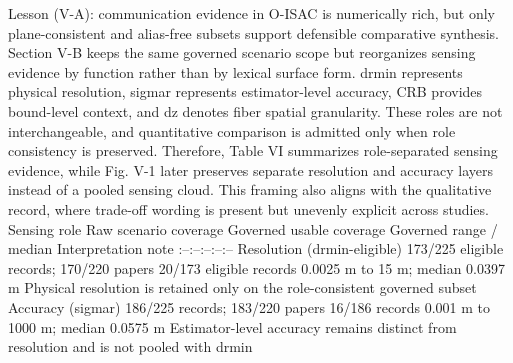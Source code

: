{}Lesson (V-A): communication evidence in O-ISAC is numerically rich, but only plane-consistent and alias-free subsets support defensible comparative synthesis.\markdownRendererInterblockSeparator
{}
\markdownRendererSectionEnd 
\markdownRendererSectionEnd \markdownRendererSectionBegin
{}\markdownRendererInterblockSeparator
{}Section V-B keeps the same governed scenario scope but reorganizes sensing evidence by function rather than by lexical surface form. drmin represents physical resolution, sigma\markdownRendererUnderscore{}r represents estimator-level accuracy, CRB provides bound-level context, and dz denotes fiber spatial granularity. These roles are not interchangeable, and quantitative comparison is admitted only when role consistency is preserved. Therefore, Table VI summarizes role-separated sensing evidence, while Fig. V-1 later preserves separate resolution and accuracy layers instead of a pooled sensing cloud. This framing also aligns with the qualitative record, where trade-off wording is present but unevenly explicit across studies.\markdownRendererInterblockSeparator
{}\markdownRendererSectionBegin
{}\markdownRendererInterblockSeparator
{}\markdownRendererPipe{} Sensing role \markdownRendererPipe{} Raw scenario coverage \markdownRendererPipe{} Governed usable coverage \markdownRendererPipe{} Governed range / median \markdownRendererPipe{} Interpretation note \markdownRendererPipe{}\markdownRendererSoftLineBreak
{}\markdownRendererPipe{}:--\markdownRendererPipe{}:--\markdownRendererPipe{}:--\markdownRendererPipe{}:--\markdownRendererPipe{}:--\markdownRendererPipe{}\markdownRendererSoftLineBreak
{}\markdownRendererPipe{} Resolution (\markdownRendererDollarSign{}dr\markdownRendererUnderscore{}\markdownRendererLeftBrace{}min\markdownRendererRightBrace{}\markdownRendererDollarSign{}-eligible) \markdownRendererPipe{} 173/225 eligible records; 170/220 papers \markdownRendererPipe{} 20/173 eligible records \markdownRendererPipe{} 0.0025 m to 15 m; median 0.0397 m \markdownRendererPipe{} Physical resolution is retained only on the role-consistent governed subset \markdownRendererPipe{}\markdownRendererSoftLineBreak
{}\markdownRendererPipe{} Accuracy (\markdownRendererDollarSign{}\markdownRendererBackslash{}sigma\markdownRendererUnderscore{}r\markdownRendererDollarSign{}) \markdownRendererPipe{} 186/225 records; 183/220 papers \markdownRendererPipe{} 16/186 records \markdownRendererPipe{} 0.001 m to 1000 m; median 0.0575 m \markdownRendererPipe{} Estimator-level accuracy remains distinct from resolution and is not pooled with \markdownRendererDollarSign{}dr\markdownRendererUnderscore{}\markdownRendererLeftBrace{}min\markdownRendererRightBrace{}\markdownRendererDollarSign{} \markdownRendererPipe{}\markdownRendererSoftLineBreak
